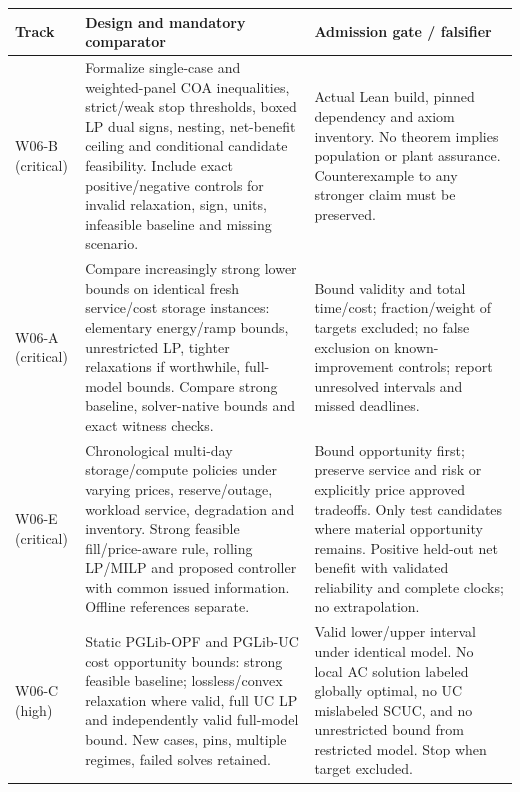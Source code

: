 \begin{longtable}{P{.14\linewidth}P{.43\linewidth}P{.34\linewidth}}
\toprule Track & Design and mandatory comparator & Admission gate / falsifier\\\midrule\endhead
W06-B (critical) & Formalize single-case and weighted-panel COA inequalities, strict/weak stop thresholds, boxed LP dual signs, nesting, net-benefit ceiling and conditional candidate feasibility. Include exact positive/negative controls for invalid relaxation, sign, units, infeasible baseline and missing scenario. & Actual Lean build, pinned dependency and axiom inventory. No theorem implies population or plant assurance. Counterexample to any stronger claim must be preserved.\\
W06-A (critical) & Compare increasingly strong lower bounds on identical fresh service/cost storage instances: elementary energy/ramp bounds, unrestricted LP, tighter relaxations if worthwhile, full-model bounds. Compare strong baseline, solver-native bounds and exact witness checks. & Bound validity and total time/cost; fraction/weight of targets excluded; no false exclusion on known-improvement controls; report unresolved intervals and missed deadlines.\\
W06-E (critical) & Chronological multi-day storage/compute policies under varying prices, reserve/outage, workload service, degradation and inventory. Strong feasible fill/price-aware rule, rolling LP/MILP and proposed controller with common issued information. Offline references separate. & Bound opportunity first; preserve service and risk or explicitly price approved tradeoffs. Only test candidates where material opportunity remains. Positive held-out net benefit with validated reliability and complete clocks; no extrapolation.\\
W06-C (high) & Static PGLib-OPF and PGLib-UC cost opportunity bounds: strong feasible baseline; lossless/convex relaxation where valid, full UC LP and independently valid full-model bound. New cases, pins, multiple regimes, failed solves retained. & Valid lower/upper interval under identical model. No local AC solution labeled globally optimal, no UC mislabeled SCUC, and no unrestricted bound from restricted model. Stop when target excluded.\\\bottomrule
\end{longtable}

